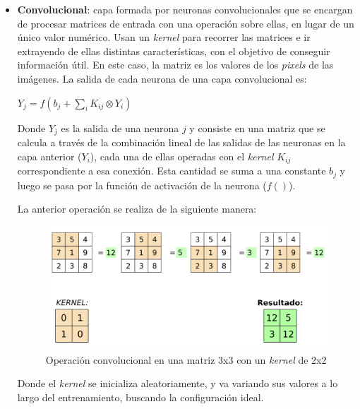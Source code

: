 \documentclass{uc3mpracticas}
\begin{document}
  \begin{itemize}
    \item \textbf{Convolucional}: capa formada por neuronas convolucionales que se encargan de procesar matrices de entrada con una operación sobre ellas, en lugar de un único valor numérico. Usan un \textit{kernel} para recorrer las matrices e ir extrayendo de ellas distintas características, con el objetivo de conseguir información útil. En este caso, la matriz es los valores de los \textit{pixels} de las imágenes. La salida de cada neurona de una capa convolucional es:

    \begin{center}
      $ \displaystyle Y_{j}=f\left(b_{j}+\sum_{i}K_{ij}\otimes Y_{i}\right) $
    \end{center}


    Donde $\displaystyle Y_{j}$ es la salida de una neurona $\displaystyle j$ y consiste en una matriz que se calcula a través de la combinación lineal de las salidas de las neuronas en la capa anterior ($\displaystyle Y_{i}$), cada una de ellas operadas con el \textit{kernel} $\displaystyle K_{ij}$ correspondiente a esa conexión. Esta cantidad se suma a una constante $\displaystyle b_{j}$ y luego se pasa por la función de activación de la neurona ($\displaystyle f()$).

    \vspace{2mm}

    La anterior operación se realiza de la siguiente manera:

    \begin{figure}[H]
      \centering
      \includegraphics[width=\textwidth]{Images/kernel.png}
      \caption{Operación convolucional en una matriz 3x3 con un \textit{kernel} de 2x2}
    \end{figure}

    Donde el \textit{kernel} se inicializa aleatoriamente, y va variando sus valores a lo largo del entrenamiento, buscando la configuración ideal.


\end{itemize}
\end{document}
